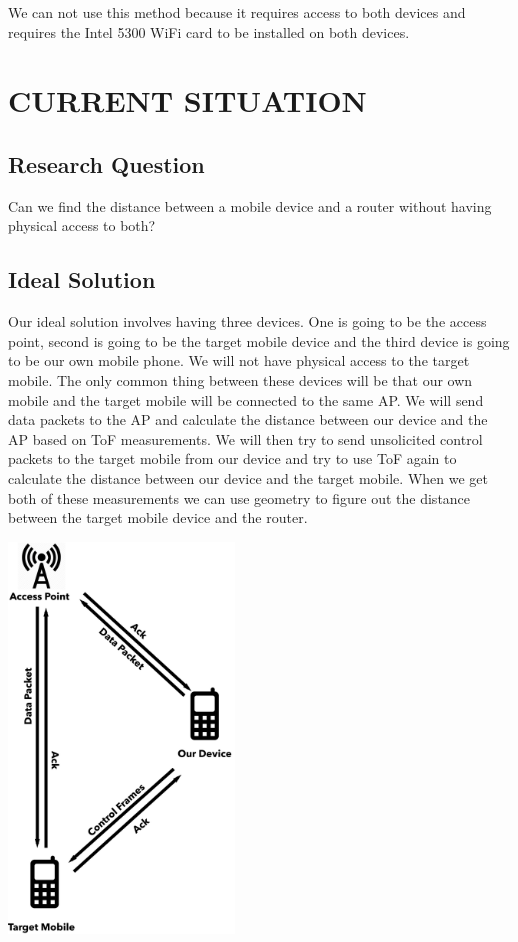 \documentclass[letterpaper, 10 pt, conference]{ieeeconf}  %
\begin{document}
We can not use this method because it requires access to both devices and requires the Intel 5300 WiFi card to be installed on both devices. 


\section{CURRENT SITUATION}

\subsection{Research Question} 

Can we find the distance between a mobile device and a router without having physical access to both?

\subsection{Ideal Solution}

Our ideal solution involves having three devices. One is going to be the access point, second is going to be the target mobile device and the third device is going to be our own mobile phone. We will not have physical access to the target mobile. The only common thing between these devices will be that our own mobile and the target mobile will be connected to the same AP. 
We will send data packets to the AP and calculate the distance between our device and the AP based on ToF measurements. We will then try to send unsolicited control packets to the target mobile from our device and try to use ToF again to calculate the distance between our device and the target mobile. When we get both of these measurements we can use geometry to figure out the distance between the target mobile device and the router.

\begin{center}
\includegraphics[width=6cm]{Slice_3.png}
\end{center}
\end{document}
